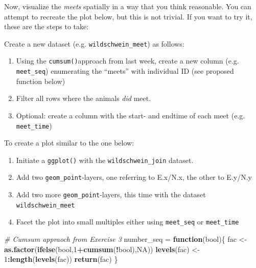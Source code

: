 \documentclass[]{book}
\newenvironment{Shaded}{\begin{snugshade}}{\end{snugshade}}
\newcommand{\CommentTok}[1]{\textcolor[rgb]{0.56,0.35,0.01}{\textit{#1}}}
\newcommand{\ControlFlowTok}[1]{\textcolor[rgb]{0.13,0.29,0.53}{\textbf{#1}}}
\newcommand{\DecValTok}[1]{\textcolor[rgb]{0.00,0.00,0.81}{#1}}
\newcommand{\KeywordTok}[1]{\textcolor[rgb]{0.13,0.29,0.53}{\textbf{#1}}}
\newcommand{\NormalTok}[1]{#1}
\newcommand{\OperatorTok}[1]{\textcolor[rgb]{0.81,0.36,0.00}{\textbf{#1}}}
\newcommand{\OtherTok}[1]{\textcolor[rgb]{0.56,0.35,0.01}{#1}}
\newcommand{\StringTok}[1]{\textcolor[rgb]{0.31,0.60,0.02}{#1}}
\providecommand{\tightlist}{%
  \setlength{\itemsep}{0pt}\setlength{\parskip}{0pt}}
\begin{document}
Now, visualize the \emph{meets} spatially in a way that you think reasonable. You can attempt to recreate the plot below, but this is not trivial. If you want to try it, these are the steps to take:

Create a new dataset (e.g. \texttt{wildschwein\_meet}) as follows:

\begin{enumerate}
\def\labelenumi{\arabic{enumi}.}
\tightlist
\item
  Using the \texttt{cumsum()}approach from last week, create a new column (e.g. \texttt{meet\_seq}) enumerating the ``meets'' with individual ID (see proposed function below)
\item
  Filter all rows where the animals \emph{did} meet.
\item
  Optional: create a column with the start- and endtime of each meet (e.g. \texttt{meet\_time})
\end{enumerate}

To create a plot similar to the one below:

\begin{enumerate}
\def\labelenumi{\arabic{enumi}.}
\tightlist
\item
  Initiate a \texttt{ggplot()} with the \texttt{wildschwein\_join} dataset.
\item
  Add two \texttt{geom\_point}-layers, one referring to E.x/N.x, the other to E.y/N.y
\item
  Add two more \texttt{geom\_point}-layers, this time with the dataset \texttt{wildschwein\_meet}
\item
  Facet the plot into small multiples either using \texttt{meet\_seq} or \texttt{meet\_time}
\end{enumerate}

\begin{Shaded}
\begin{Highlighting}[]
\CommentTok{# Cumsum appraoch from Exercise 3}
\NormalTok{number_seq =}\StringTok{ }\ControlFlowTok{function}\NormalTok{(bool)\{}
\NormalTok{  fac <-}\StringTok{ }\KeywordTok{as.factor}\NormalTok{(}\KeywordTok{ifelse}\NormalTok{(bool,}\DecValTok{1}\OperatorTok{+}\KeywordTok{cumsum}\NormalTok{(}\OperatorTok{!}\NormalTok{bool),}\OtherTok{NA}\NormalTok{))}
  \KeywordTok{levels}\NormalTok{(fac) <-}\StringTok{ }\DecValTok{1}\OperatorTok{:}\KeywordTok{length}\NormalTok{(}\KeywordTok{levels}\NormalTok{(fac))}
  \KeywordTok{return}\NormalTok{(fac)}
\NormalTok{\}}
\end{Highlighting}
\end{Shaded}
\end{document}
